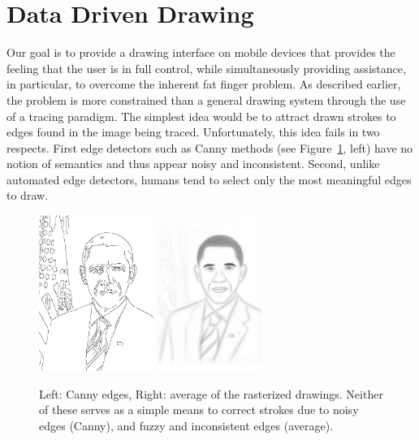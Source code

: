 \section{Data Driven Drawing}

Our goal is to provide a drawing interface on mobile devices that provides the feeling that the user is in full control, while simultaneously providing assistance, in particular, to overcome the inherent fat finger problem. As described earlier, the problem is more constrained than a general drawing system through the use of a tracing paradigm. The simplest idea would be to attract drawn strokes to edges found in the image being traced. Unfortunately, this idea fails in two respects. First edge detectors such as Canny methods (see Figure~\ref{fig:edges}, left) have no notion of semantics and thus appear noisy and inconsistent. Second, unlike automated edge detectors, humans tend to select only the most meaningful edges to draw.

\begin{figure}
  \centering%
\includegraphics[height=2in]{figures/imagetable/edges_bo.png}
\hspace{0.1in}
\includegraphics[height=2in]{figures/imagetable/avg_bo.png}
  \caption{Left: Canny edges, Right: average of the rasterized drawings. Neither of these serves as a simple means to correct strokes due to noisy edges (Canny), and fuzzy and inconsistent edges (average).}
  \label{fig:edges}
\end{figure}

